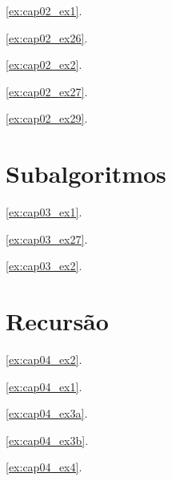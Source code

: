 \ref{ex:cap02_ex1}.


\ref{ex:cap02_ex26}.


\ref{ex:cap02_ex2}.


\ref{ex:cap02_ex27}.


\ref{ex:cap02_ex29}.


\section{Subalgoritmos}

\ref{ex:cap03_ex1}.


\ref{ex:cap03_ex27}.
 

\ref{ex:cap03_ex2}.


\section{Recursão}

\ref{ex:cap04_ex2}.


\ref{ex:cap04_ex1}.


\ref{ex:cap04_ex3a}.


\ref{ex:cap04_ex3b}.


\ref{ex:cap04_ex4}.

